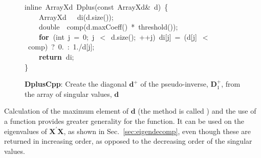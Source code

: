 \documentclass[shortnames,article]{jss}
\newcommand{\hlstd}[1]{\textcolor[rgb]{0,0,0}{#1}}
\newcommand{\hlnum}[1]{\textcolor[rgb]{0,0,0}{#1}}
\newcommand{\hlopt}[1]{\textcolor[rgb]{0,0,0}{#1}}
\newcommand{\hlkwa}[1]{\textcolor[rgb]{0.61,0.13,0.93}{\bf{#1}}}
\newcommand{\hlkwb}[1]{\textcolor[rgb]{0.13,0.54,0.13}{#1}}
\newcommand{\hlkwc}[1]{\textcolor[rgb]{0,0,1}{#1}}
\newcommand{\hlkwd}[1]{\textcolor[rgb]{0,0,0}{#1}}
\begin{document}
\begin{figure}[htb]
  \noindent
  \ttfamily
  \hlstd{}\hlkwc{inline\ }\hlstd{ArrayXd\ }\hlkwd{Dplus}\hlstd{}\hlopt{(}\hlstd{}\hlkwb{const\ }\hlstd{ArrayXd}\hlopt{\&\ }\hlstd{d}\hlopt{)\ \{}\hspace*{\fill}\\
  \hlstd{}\hlstd{\ \ \ \ }\hlstd{ArrayXd}\hlstd{\ \ \ }\hlstd{}\hlkwd{di}\hlstd{}\hlopt{(}\hlstd{d}\hlopt{.}\hlstd{}\hlkwd{size}\hlstd{}\hlopt{());}\hspace*{\fill}\\
  \hlstd{}\hlstd{\ \ \ \ }\hlstd{}\hlkwb{double}\hlstd{\ \ }\hlkwb{}\hlstd{}\hlkwd{comp}\hlstd{}\hlopt{(}\hlstd{d}\hlopt{.}\hlstd{}\hlkwd{maxCoeff}\hlstd{}\hlopt{()\ {*}\ }\hlstd{}\hlkwd{threshold}\hlstd{}\hlopt{());}\hspace*{\fill}\\
  \hlstd{}\hlstd{\ \ \ \ }\hlstd{}\hlkwa{for\ }\hlstd{}\hlopt{(}\hlstd{}\hlkwb{int\ }\hlstd{j\ }\hlopt{=\ }\hlstd{}\hlnum{0}\hlstd{}\hlopt{;\ }\hlstd{j\ }\hlopt{$<$\ }\hlstd{d}\hlopt{.}\hlstd{}\hlkwd{size}\hlstd{}\hlopt{();\ ++}\hlstd{j}\hlopt{)\ }\hlstd{di}\hlopt{{[}}\hlstd{j}\hlopt{{]}\ =\ (}\hlstd{d}\hlopt{{[}}\hlstd{j}\hlopt{{]}\ $<$\ }\hlstd{comp}\hlopt{)\ }\hlstd{?\ }\hlnum{0}\hlstd{}\hlopt{.\ :\ }\hlstd{}\hlnum{1}\hlstd{}\hlopt{./}\hlstd{d}\hlopt{{[}}\hlstd{j}\hlopt{{]};}\hspace*{\fill}\\
  \hlstd{}\hlstd{\ \ \ \ }\hlstd{}\hlkwa{return\ }\hlstd{di}\hlopt{;}\hspace*{\fill}\\
  \hlstd{}\hlopt{\}}\hlstd{}\hspace*{\fill}\\
  \mbox{}
  \normalfont
  \normalsize
  \caption{\textbf{DplusCpp}: Create the diagonal $\bm d^+$ of the pseudo-inverse, $\bm D_1^+$, from the array of singular values, $\bm d$}
  \label{Dplus}
\end{figure}

Calculation of the maximum element of $\bm d$ (the method is called
) and the use of a  function
provides greater generality for the function.  It can be used on the
eigenvalues of $\bm X^\prime\bm X$, as shown in
Sec.~\ref{sec:eigendecomp}, even though these are returned in
increasing order, as opposed to the decreasing order of the singular
values.
\end{document}
